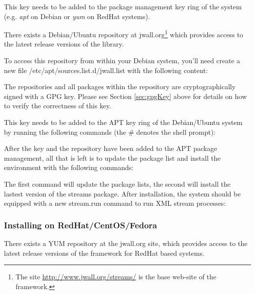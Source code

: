 This key needs to be added to the package management key ring of the
system (e.g. {\em apt} on Debian or {\em yum} on RedHat systems).

There exists a Debian/Ubuntu repository at {\ttfamily
  jwall.org}\footnote{The site \url{http://www.jwall.org/streams/} is
  the base web-site of the \streams framework.} which provides access
to the latest release versions of the \streams library.

To access this repository from within your Debian system, you'll need
create a new file {\ttfamily /etc/apt/sources.list.d/jwall.list} with
the following content:

\hspace{4ex} 

The repositories and all packages within the repository are
cryptographically signed with a GPG key. Please see Section
\ref{sec:gpgKey} above for details on how to verify the correctness of
this key.

This key needs to be added to the APT key ring of the Debian/Ubuntu
system by running the following commands (the {\ttfamily \#} denotes
the shell prompt):

\hspace{4ex}

After the key and the repository have been added to the APT package
management, all that is left is to update the package list and install
the \streams environment with the following commands:

\hspace{4ex}

The first command will update the package lists, the second will install
the lastest version of the {\ttfamily streams} package. After installation,
the system should be equipped with a new {\ttfamily stream.run} command
to run XML stream processes:

\hspace{4ex}

\subsubsection{\label{sec:installRPM}Installing \streams on RedHat/CentOS/Fedora}
There exists a YUM repository at the {\ttfamily jwall.org} site, which
provides access to the latest release versions of the \streams framework
for RedHat based systems.


